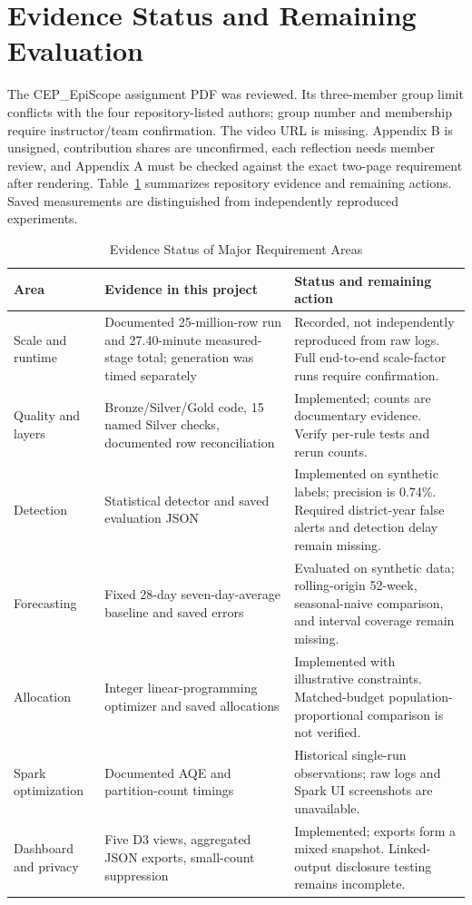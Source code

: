 ﻿\documentclass[conference]{IEEEtran}
\begin{document}
\section*{Evidence Status and Remaining Evaluation}
The CEP\_EpiScope assignment PDF was reviewed. Its three-member group limit conflicts with the four repository-listed authors; group number and membership require instructor/team confirmation. The video URL is missing. Appendix B is unsigned, contribution shares are unconfirmed, each reflection needs member review, and Appendix A must be checked against the exact two-page requirement after rendering. Table~\ref{tab:evidence} summarizes repository evidence and remaining actions. Saved measurements are distinguished from independently reproduced experiments.

\begin{table}[htbp]
\caption{Evidence Status of Major Requirement Areas}
\label{tab:evidence}
\centering\small
\begin{tabularx}{\textwidth}{p{3.0cm}X p{4.4cm}}
\toprule
Area & Evidence in this project & Status and remaining action \\
\midrule
Scale and runtime & Documented 25-million-row run and 27.40-minute measured-stage total; generation was timed separately & Recorded, not independently reproduced from raw logs. Full end-to-end scale-factor runs require confirmation. \\
Quality and layers & Bronze/Silver/Gold code, 15 named Silver checks, documented row reconciliation & Implemented; counts are documentary evidence. Verify per-rule tests and rerun counts. \\
Detection & Statistical detector and saved evaluation JSON & Implemented on synthetic labels; precision is 0.74\%. Required district-year false alerts and detection delay remain missing. \\
Forecasting & Fixed 28-day seven-day-average baseline and saved errors & Evaluated on synthetic data; rolling-origin 52-week, seasonal-naive comparison, and interval coverage remain missing. \\
Allocation & Integer linear-programming optimizer and saved allocations & Implemented with illustrative constraints. Matched-budget population-proportional comparison is not verified. \\
Spark optimization & Documented AQE and partition-count timings & Historical single-run observations; raw logs and Spark UI screenshots are unavailable. \\
Dashboard and privacy & Five D3 views, aggregated JSON exports, small-count suppression & Implemented; exports form a mixed snapshot. Linked-output disclosure testing remains incomplete. \\
\bottomrule
\end{tabularx}
\end{table}
\end{document}
